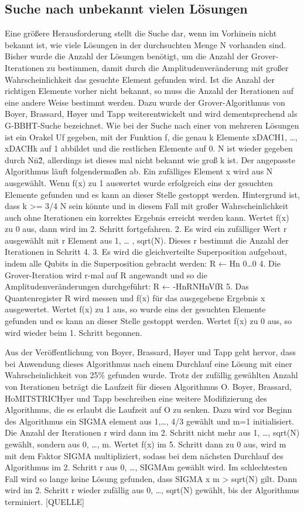 \subsection{Suche nach unbekannt vielen Lösungen}
Eine größere Herausforderung stellt die Suche dar, wenn im Vorhinein nicht bekannt ist, wie viele Lösungen in der durchsuchten Menge N vorhanden sind. Bisher wurde die Anzahl der Lösungen benötigt, um die Anzahl der Grover-Iterationen zu bestimmen, damit durch die Amplitudenveränderung mit großer Wahrscheinlichkeit das gesuchte Element gefunden wird. Ist die Anzahl der richtigen Elemente vorher nicht bekannt, so muss die Anzahl der Iterationen auf eine andere Weise bestimmt werden. Dazu wurde der Grover-Algorithmus von Boyer, Brassard, Høyer und Tapp weiterentwickelt und wird dementsprechend als G-BBHT-Suche bezeichnet.
Wie bei der Suche nach einer von mehreren Lösungen ist ein Orakel Uf gegeben, mit der Funktion f, die genau k Elemente xDACH1, …, xDACHk auf 1 abbildet und die restlichen Elemente auf 0. N ist wieder gegeben durch N\=n\^2, allerdings ist dieses mal nicht bekannt wie groß k ist. Der angepasste Algorithmus läuft folgendermaßen ab. Ein zufälliges Element x wird aus N ausgewählt. Wenn f(x) zu 1 auswertet wurde erfolgreich eins der gesuchten Elemente gefunden und es kann an dieser Stelle gestoppt werden. Hintergrund ist, dass k >= 3/4 N sein könnte und in diesem Fall mit großer Wahrscheinlichkeit auch ohne Iterationen ein korrektes Ergebnis erreicht werden kann. Wertet f(x) zu 0 aus, dann wird im 2. Schritt fortgefahren.
2. Es wird ein zufälliger Wert r ausgewählt mit r Element aus 1, … , sqrt(N). Dieses r bestimmt die Anzahl der Iterationen in Schritt 4.
3. Es wird die gleichverteilte Superposition aufgebaut, indem alle Qubits in die Superposition gebracht werden:
R ← Hn 0…0
4. Die Grover-Iteration wird r-mal auf R angewandt und so die Amplitudenveränderungen durchgeführt:
R ← -HnRNHnVfR
5. Das Quantenregister R wird messen und f(x) für das ausgegebene Ergebnis x ausgewertet. Wertet f(x) zu 1 aus, so wurde eins der gesuchten Elemente gefunden und es kann an dieser Stelle gestoppt werden. Wertet f(x) zu 0 aus, so wird wieder beim 1. Schritt begonnen.

Aus der Veröffentlichung von Boyer, Brassard, Høyer und Tapp geht hervor, dass bei Anwendung dieses Algorithmus nach einem Durchlauf eine Lösung mit einer Wahrscheinlichkeit von 25\% gefunden wurde. Trotz der zufällig gewählten Anzahl von Iterationen beträgt die Laufzeit für diesen Algorithmus O.
Boyer, Brassard, HoMITSTRICHyer und Tapp beschreiben eine weitere Modifizierung des Algorithmus, die es erlaubt die Laufzeit auf O zu senken. 
Dazu wird vor Beginn des Algorithmus ein SIGMA element aus {1,…, 4/3} gewählt und m=1 initialisiert. Die Anzahl der Iterationen r wird dann im 2. Schritt nicht mehr aus {1, …, sqrt(N)} gewählt, sondern aus {0, …, m}. Wertet f(x) im 5. Schritt dann zu 0 aus, wird m mit dem Faktor SIGMA multipliziert, sodass bei dem nächsten Durchlauf des Algorithmus im 2. Schritt r aus {0, …, SIGMAm} gewählt wird. Im schlechtesten Fall wird so lange keine Lösung gefunden, dass SIGMA x m > sqrt(N) gilt. Dann wird im 2. Schritt r wieder zufällig aus {0,  …, sqrt(N)} gewählt, bis der Algorithmus terminiert. [QUELLE]


